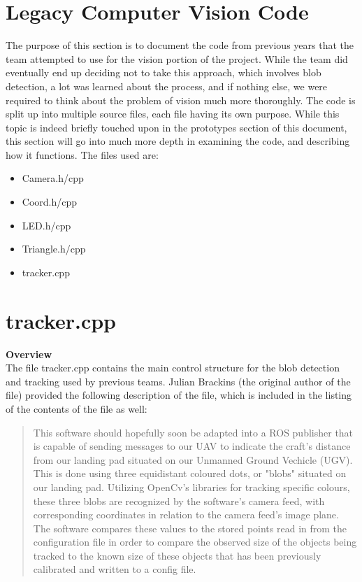 \documentclass[11pt]{book}
\begin{document}
\section*{Legacy Computer Vision Code}
\noindent The purpose of this section is to document the code from previous years that the team attempted to use for the vision portion of the project. While the team did eventually end up deciding not to take this approach, which involves blob detection, a lot was learned about the process, and if nothing else, we were required to think about the problem of vision much more thoroughly. The code is split up into multiple source files, each file having its own purpose. While this topic is indeed briefly touched upon in the prototypes section of this document, this section will go into much more depth in examining the code, and describing how it functions. The files used are:
\begin{itemize}
\item Camera.h/cpp
\item Coord.h/cpp
\item LED.h/cpp
\item Triangle.h/cpp
\item tracker.cpp
\end{itemize}

\section*{tracker.cpp}
\large{\textbf{Overview}}\\
\normalsize
\noindent The file tracker.cpp contains the main control structure for the blob detection and tracking used by previous teams. Julian Brackins (the original author of the file) provided the following description of the file, which is included in the listing of the contents of the file as well:

\begin{quote}
\centering
This software should hopefully soon be adapted into a ROS publisher that is capable of sending messages to our UAV to indicate the craft's distance from our landing pad situated on our Unmanned Ground Vechicle (UGV). This is done using three equidistant coloured dots, or "blobs" situated on our landing pad. Utilizing OpenCv's libraries for tracking specific colours, these three blobs are recognized by the software's camera feed, with corresponding coordinates in relation to the camera feed's image plane. The software compares these values to the stored points read in from the configuration file in order to compare the observed size of the objects being tracked to the known size of these objects that has been previously calibrated and written to a config file.
\end{quote}
\end{document}
